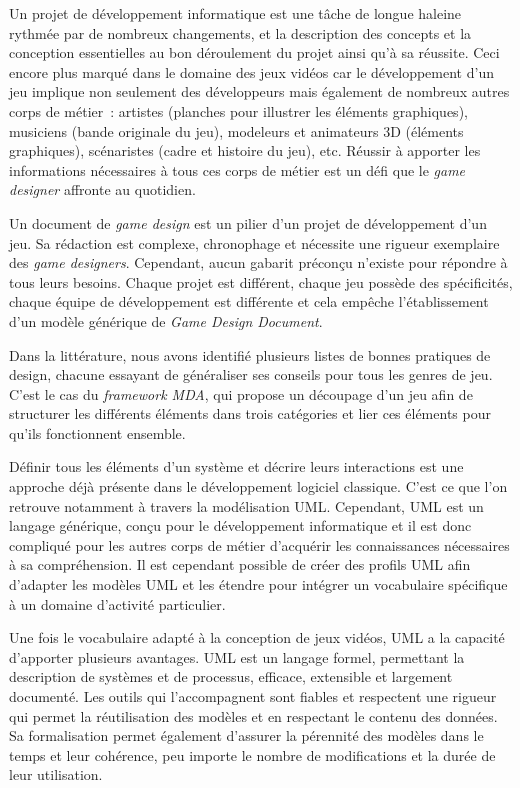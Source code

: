 \begin{conclusion}

Un projet de développement informatique est une tâche de longue haleine rythmée par de nombreux changements,
et
la description des concepts et la conception essentielles au bon déroulement du projet ainsi qu'à sa réussite.
%
Ceci encore plus marqué dans le domaine des jeux vidéos car
le développement d'un jeu implique non seulement des développeurs mais également de nombreux autres corps de métier~: artistes (planches pour illustrer les éléments graphiques),  musiciens (bande originale du jeu), modeleurs et animateurs 3D (éléments graphiques), scénaristes (cadre et histoire du jeu), etc.
Réussir à apporter les informations nécessaires à tous ces corps de métier est un défi que le \emph{game designer} affronte au quotidien.

Un document de \emph{game design} est un pilier d'un projet de développement d'un jeu.
Sa rédaction est complexe, chronophage et nécessite une rigueur exemplaire des \emph{game designers}.
Cependant, aucun gabarit préconçu n'existe pour répondre à tous leurs besoins.
Chaque projet est différent, chaque jeu possède des spécificités, chaque équipe de développement est différente et cela empêche l'établissement d'un modèle générique de \emph{Game Design Document}.

Dans la littérature, nous avons identifié plusieurs listes de bonnes pratiques de design, chacune essayant de généraliser ses conseils pour tous les genres de jeu.
C'est le cas du \emph{framework MDA}, qui propose un découpage d'un jeu afin de structurer les différents éléments dans trois catégories et lier ces éléments pour qu'ils fonctionnent ensemble.

Définir tous les éléments d'un système et décrire leurs interactions est une approche déjà présente dans le développement logiciel classique.
C'est ce que l'on retrouve notamment à travers la modélisation UML.
Cependant, UML est un langage générique, conçu pour le développement informatique et il est donc compliqué pour les autres corps de métier d'acquérir les connaissances nécessaires à sa compréhension.
Il est cependant possible de créer des profils UML afin d'adapter les modèles UML et les étendre pour intégrer un vocabulaire spécifique à un domaine d'activité particulier.

Une fois le vocabulaire adapté à la conception de jeux vidéos, UML a la capacité d'apporter plusieurs avantages.
UML est un langage formel, permettant la description de systèmes et de processus, efficace, extensible et largement documenté.
Les outils qui l'accompagnent sont fiables et respectent une rigueur qui permet la réutilisation des modèles et en respectant le contenu des données.
Sa formalisation permet également d'assurer la pérennité des modèles dans le temps et leur cohérence, peu importe le nombre de modifications et la durée de leur utilisation.


\end{conclusion}
